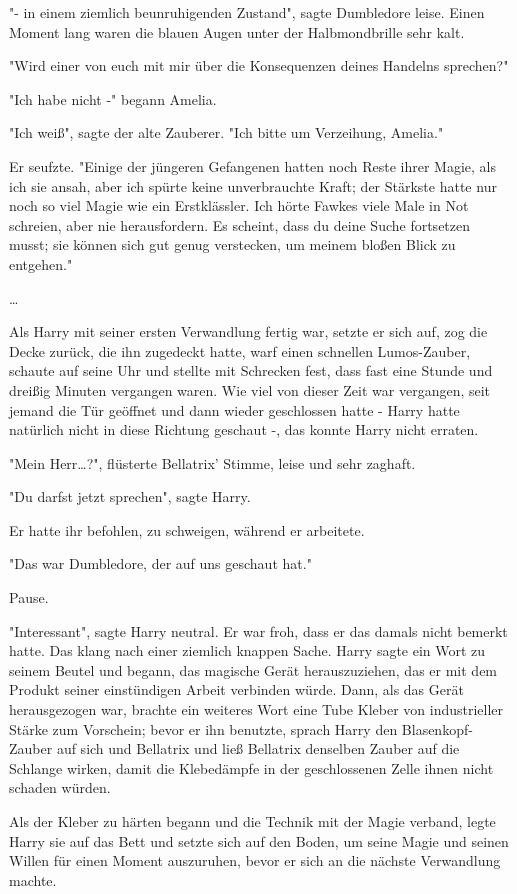 {"- in einem ziemlich beunruhigenden Zustand", sagte Dumbledore leise. Einen Moment lang waren die blauen Augen unter der Halbmondbrille sehr kalt.

"Wird einer von euch mit mir über die Konsequenzen deines Handelns sprechen?"

"Ich habe nicht -" begann Amelia.

"Ich weiß", sagte der alte Zauberer. "Ich bitte um Verzeihung, Amelia."

Er seufzte. "Einige der jüngeren Gefangenen hatten noch Reste ihrer Magie, als ich sie ansah, aber ich spürte keine unverbrauchte Kraft; der Stärkste hatte nur noch so viel Magie wie ein Erstklässler. Ich hörte Fawkes viele Male in Not schreien, aber nie herausfordern. Es scheint, dass du deine Suche fortsetzen musst; sie können sich gut genug verstecken, um meinem bloßen Blick zu entgehen."

…

Als Harry mit seiner ersten Verwandlung fertig war, setzte er sich auf, zog die Decke zurück, die ihn zugedeckt hatte, warf einen schnellen Lumos-Zauber, schaute auf seine Uhr und stellte mit Schrecken fest, dass fast eine Stunde und dreißig Minuten vergangen waren. Wie viel von dieser Zeit war vergangen, seit jemand die Tür geöffnet und dann wieder geschlossen hatte - Harry hatte natürlich nicht in diese Richtung geschaut -, das konnte Harry nicht erraten.

"Mein Herr…?", flüsterte Bellatrix' Stimme, leise und sehr zaghaft.

"Du darfst jetzt sprechen", sagte Harry.

Er hatte ihr befohlen, zu schweigen, während er arbeitete.

"Das war Dumbledore, der auf uns geschaut hat."

Pause.

"Interessant", sagte Harry neutral. Er war froh, dass er das damals nicht bemerkt hatte. Das klang nach einer ziemlich knappen Sache. Harry sagte ein Wort zu seinem Beutel und begann, das magische Gerät herauszuziehen, das er mit dem Produkt seiner einstündigen Arbeit verbinden würde. Dann, als das Gerät herausgezogen war, brachte ein weiteres Wort eine Tube Kleber von industrieller Stärke zum Vorschein; bevor er ihn benutzte, sprach Harry den Blasenkopf-Zauber auf sich und Bellatrix und ließ Bellatrix denselben Zauber auf die Schlange wirken, damit die Klebedämpfe in der geschlossenen Zelle ihnen nicht schaden würden.

Als der Kleber zu härten begann und die Technik mit der Magie verband, legte Harry sie auf das Bett und setzte sich auf den Boden, um seine Magie und seinen Willen für einen Moment auszuruhen, bevor er sich an die nächste Verwandlung machte.

}
